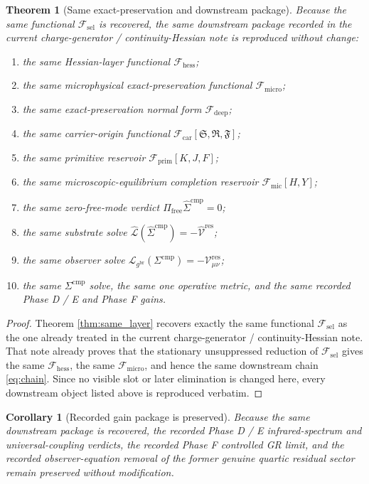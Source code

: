 \documentclass[11pt]{article}
\newcommand{\ObserverMetric}{g^{\mathrm{br}}}
\newcommand{\CompShift}{\Sigma^{\mathrm{cmp}}}
\newcommand{\CompLift}{\widehat\Sigma^{\mathrm{cmp}}}
\newcommand{\ResidualCore}{\mathcal V_{\mu\nu}^{\mathrm{res}}}
\newcommand{\ResidualLift}{\widehat{\mathcal V}^{\mathrm{res}}}
\newcommand{\SubReducedEin}{\widehat{\mathcal L}}
\newcommand{\FreeProj}{\Pi_{\mathrm{free}}}
\newcommand{\GaugeAux}{Y}
\newcommand{\ReducedEin}{\mathcal L_{\ObserverMetric}}
\newcommand{\MicFunctional}{\mathscr F_{\mathrm{mic}}}
\newcommand{\PrimFunctional}{\mathscr F_{\mathrm{prim}}}
\newcommand{\CarrierFunctional}{\mathscr F_{\mathrm{car}}}
\newcommand{\DeepFunctional}{\mathscr F_{\mathrm{deep}}}
\newcommand{\UltraFunctional}{\mathscr F_{\mathrm{micro}}}
\newcommand{\RootFunctional}{\mathscr F_{\mathrm{hess}}}
\newcommand{\StemFunctional}{\mathscr F_{\mathrm{sel}}}
\newcommand{\PrimStrain}{K}
\newcommand{\PrimNeutral}{J}
\newcommand{\PrimFree}{F}
\newcommand{\CarrierSeed}{\mathfrak S}
\newcommand{\RelabelSeed}{\mathfrak R}
\newcommand{\FreeSeed}{\mathfrak F}
\newtheorem{corollary}{Corollary}
\newtheorem{theorem}{Theorem}
\begin{document}
\begin{theorem}[Same exact-preservation and downstream package]
\label{thm:same_package}
Because the same functional \(\StemFunctional\) is recovered, the same downstream package recorded in the current charge-generator / continuity-Hessian note is reproduced without change:
\begin{enumerate}
    \item the same Hessian-layer functional \(\RootFunctional\);
    \item the same microphysical exact-preservation functional \(\UltraFunctional\);
    \item the same exact-preservation normal form \(\DeepFunctional\);
    \item the same carrier-origin functional \(\CarrierFunctional[\CarrierSeed,\RelabelSeed,\FreeSeed]\);
    \item the same primitive reservoir \(\PrimFunctional[\PrimStrain,\PrimNeutral,\PrimFree]\);
    \item the same microscopic-equilibrium completion reservoir \(\MicFunctional[H,\GaugeAux]\);
    \item the same zero-free-mode verdict \(\FreeProj\CompLift=0\);
    \item the same substrate solve \(\SubReducedEin(\CompLift)=-\ResidualLift\);
    \item the same observer solve \(\ReducedEin(\CompShift)=-\ResidualCore\);
    \item the same \(\Sigma^{\mathrm{cmp}}\) solve, the same one operative metric, and the same recorded Phase D / E and Phase F gains.
\end{enumerate}
\end{theorem}

\begin{proof}
Theorem \ref{thm:same_layer} recovers exactly the same functional \(\StemFunctional\) as the one already treated in the current charge-generator / continuity-Hessian note. That note already proves that the stationary unsuppressed reduction of \(\StemFunctional\) gives the same \(\RootFunctional\), the same \(\UltraFunctional\), and hence the same downstream chain \eqref{eq:chain}. Since no visible slot or later elimination is changed here, every downstream object listed above is reproduced verbatim.
\end{proof}

\begin{corollary}[Recorded gain package is preserved]
\label{cor:gains}
Because the same downstream package is recovered, the recorded Phase D / E infrared-spectrum and universal-coupling verdicts, the recorded Phase F controlled GR limit, and the recorded observer-equation removal of the former genuine quartic residual sector remain preserved without modification.
\end{corollary}
\end{document}
